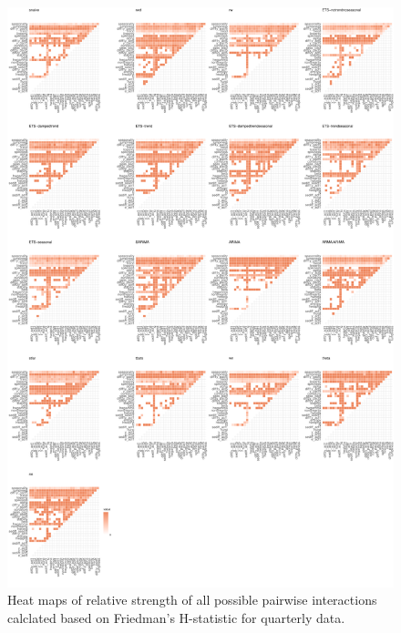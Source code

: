 \documentclass[11pt,a4paper,]{article}
\begin{document}
\begin{figure}
\centering
\includegraphics{figures/friedmanQ-1.pdf}
\caption{\label{fig:friedmanQ}Heat maps of relative strength of all possible
pairwise interactions calclated based on Friedman's H-statistic for
quarterly data.}
\end{figure}

\newpage
\end{document}
